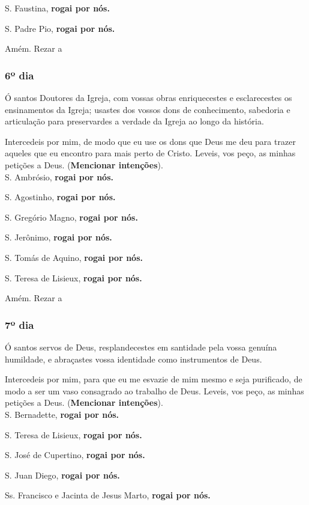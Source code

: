 \documentclass[a4paper,14pt]{extarticle} \usepackage[utf8]{inputenc}
\begin{document}
S. Faustina, \textbf{rogai por nós.}

S. Padre Pio, \textbf{rogai por nós.}

Amém. Rezar a 
\subsubsection{6º dia}

Ó santos Doutores da Igreja, com vossas obras enriquecestes e esclarecestes os ensinamentos da Igreja; usastes dos vossos dons de conhecimento, sabedoria e articulação para preservardes a verdade da Igreja ao longo da história.

Intercedeis por mim, de modo que eu use os dons que Deus me deu para trazer aqueles que eu encontro para mais perto de Cristo. Leveis, vos peço, as minhas petições a Deus. (\textbf{Mencionar intenções}).\\

S. Ambrósio, \textbf{rogai por nós.}

S. Agostinho, \textbf{rogai por nós.}

S. Gregório Magno, \textbf{rogai por nós.}

S. Jerônimo, \textbf{rogai por nós.}

S. Tomás de Aquino, \textbf{rogai por nós.}

S. Teresa de Lisieux, \textbf{rogai por nós.}

Amém. Rezar a 
\subsubsection{7º dia}

Ó santos servos de Deus, resplandecestes em santidade pela vossa genuína humildade, e abraçastes vossa identidade como instrumentos de Deus.

Intercedeis por mim, para que eu me esvazie de mim mesmo e seja purificado, de modo a ser um vaso consagrado ao trabalho de Deus. Leveis, vos peço, as minhas petições a Deus. (\textbf{Mencionar intenções}).\\

S. Bernadette, \textbf{rogai por nós.}

S. Teresa de Lisieux, \textbf{rogai por nós.}

S. José de Cupertino, \textbf{rogai por nós.}

S. Juan Diego, \textbf{rogai por nós.}

Ss. Francisco e Jacinta de Jesus Marto, \textbf{rogai por nós.}
\end{document}
